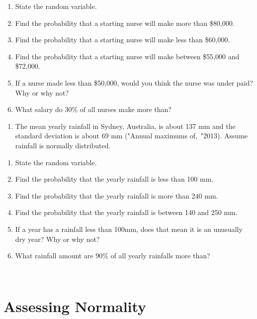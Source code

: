 \documentclass[
]{book}
\providecommand{\tightlist}{%
  \setlength{\itemsep}{0pt}\setlength{\parskip}{0pt}}
\begin{document}
\begin{enumerate}
\def\labelenumi{\alph{enumi}.}
\tightlist
\item
  State the random variable.
\item
  Find the probability that a starting nurse will make more than \$80,000.
\item
  Find the probability that a starting nurse will make less than \$60,000.
\item
  Find the probability that a starting nurse will make between \$55,000 and \$72,000.
\item
  If a nurse made less than \$50,000, would you think the nurse was under paid? Why or why not?
\item
  What salary do 30\% of all nurses make more than?
\end{enumerate}

\begin{enumerate}
\def\labelenumi{\arabic{enumi}.}
\setcounter{enumi}{9}
\tightlist
\item
  The mean yearly rainfall in Sydney, Australia, is about 137 mm and the standard deviation is about 69 mm ("Annual maximums of,~"2013). Assume rainfall is normally distributed.
\end{enumerate}

\begin{enumerate}
\def\labelenumi{\alph{enumi}.}
\tightlist
\item
  State the random variable.
\item
  Find the probability that the yearly rainfall is less than 100 mm.
\item
  Find the probability that the yearly rainfall is more than 240 mm.
\item
  Find the probability that the yearly rainfall is between 140 and 250 mm.
\item
  If a year has a rainfall less than 100mm, does that mean it is an unusually dry year? Why or why not?
\item
  What rainfall amount are 90\% of all yearly rainfalls more than?
\end{enumerate}

\textbf{\\
}

\hypertarget{assessing-normality}{%
\section{Assessing Normality}\label{assessing-normality}}
\end{document}
